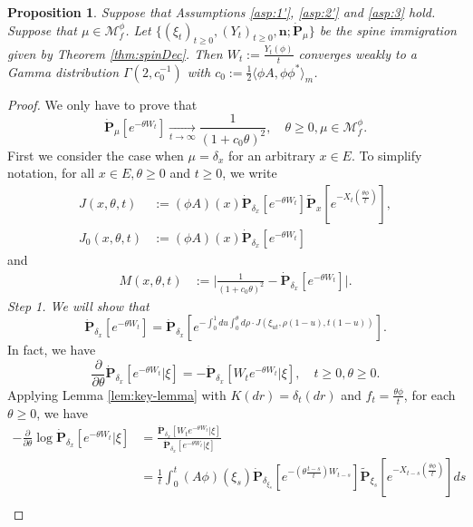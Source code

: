 \documentclass[UTF8]{pkuthss}
\theoremstyle{plain}
\newtheorem{prop}[thm]{Proposition}
\theoremstyle{definition}
\numberwithin{equation}{section}
\begin{document}
\begin{prop}
\label{prop:yaglTheorSpinImmigr}
	Suppose that Assumptions \ref{asp:1'}, \ref{asp:2'}  and \ref{asp:3} hold.
	Suppose that $\mu \in \mathcal M_f^\phi$. Let $\{(\xi_t)_{t\geq 0}, (Y_t)_{t\geq 0}, \mathbf n; \dot {\mathbf P}_\mu\}$ be the spine immigration given by Theorem \ref{thm:spinDec}.
Then $W_t:= \frac{Y_t(\phi)}{t}$ converges weakly to a Gamma distribution
	$\Gamma(2,c_0^{-1})$ with $c_0 := \frac {1} {2} \langle \phi  A, \phi \phi^* \rangle_m$.
\end{prop}
\begin{proof}
We only have to prove that
\[
	\dot{\mathbf P}_\mu[e^{-\theta W_t}]
	\xrightarrow[t\to\infty]{}\frac{1}{(1 + c_0 \theta)^2},
	\quad \theta \geq 0,\mu\in \mathcal M^\phi_f.
\]
 First we consider the case when $\mu = \delta_x$ for an arbitrary $x\in E$.
	To simplify  notation, for all $x\in E,\theta\geq 0$ and $t\geq 0$, we write
\[\begin{split}
	J(x,\theta,t)
&:=(\phi A)(x)\dot{\mathbf P}_{\delta_{x}}[e^{-\theta W_t}]\widetilde{\mathbf P}_{x}[e^{-X_t(\frac{\theta\phi}{t})}],\\
	J_0(x,\theta,t)
&:=(\phi A)(x)\dot{\mathbf P}_{\delta_x}[e^{-\theta W_t}]
\end{split}\]
	and
\[\begin{split}
	M(x,\theta,t)
	&:=\Big|\frac{1}{(1+c_0\theta)^2}-\dot{\mathbf P}_{\delta_x}[e^{-\theta W_t}]\Big|.
\end{split}\]
	\emph{Step 1.  We will show that}
\begin{equation}\label{eq:yaglTheorSpinImmigrStep1}
	\dot{\mathbf P}_{\delta_x}[e^{-\theta W_t}]
	=\dot{\mathbf P}_{\delta_x}[ e^{-\int_0^1 du\int_0^\theta d\rho\cdot J(\xi_{ut},\rho(1-u),t(1-u))} ].
\end{equation}
	In fact, we have
\[
	\frac{\partial}{\partial \theta}\dot{\mathbf P}_{\delta_x}[e^{-\theta W_t}|\xi]
	= -\dot{\mathbf P}_{\delta_x}[W_te^{-\theta W_t}|\xi],
	\quad t\geq 0,\theta \geq 0.
\]
	Applying Lemma \ref{lem:key-lemma} with $K(dr)=\delta_t(dr)$ and $f_t=\frac{\theta\phi}{t}$, for each $\theta \geq 0$, we have
\[\begin{split}
	-\frac{\partial}{\partial \theta}\log \dot{\mathbf P}_{\delta_x}[e^{-\theta W_t}|\xi]
	&=\frac{\dot{\mathbf P}_{\delta_x} [W_t e^{-\theta W_t}|\xi]}{\dot{\mathbf P}_{\delta_x}[e^{-\theta W_t}|\xi]}\\
	&=\frac{1}{t}\int_0^t  (A\phi)(\xi_s)\dot{\mathbf P}_{\delta_{\xi_s}}[e^{-(\theta \frac{t-s}{t})W_{t-s}}]\widetilde{\mathbf P}_{\xi_s}[e^{-X_{t-s}(\frac{\theta\phi}{t})}]ds\\

\end{split}\]
\end{proof}
\end{document}
